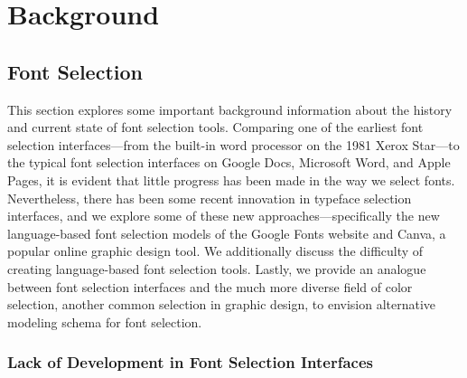\chapter{Background}
\label{chap:background}

\section{Font Selection}

This section explores some important background information about the history and current state of font selection tools. Comparing one of the earliest font selection interfaces---from the built-in word processor on the 1981 Xerox Star---to the typical font selection interfaces on Google Docs, Microsoft Word, and Apple Pages, it is evident that little progress has been made in the way we select fonts. Nevertheless, there has been some recent innovation in typeface selection interfaces, and we explore some of these new approaches---specifically the new language-based font selection models of the Google Fonts website and Canva, a popular online graphic design tool. We additionally discuss the difficulty of creating language-based font selection tools. Lastly, we provide an analogue between font selection interfaces and the much more diverse field of color selection, another common selection in graphic design, to envision alternative modeling schema for font selection.

\subsection{Lack of Development in Font Selection Interfaces}

